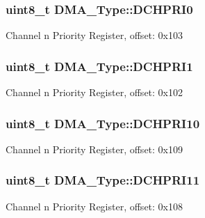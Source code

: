 \subsubsection[{\texorpdfstring{D\+C\+H\+P\+R\+I0}{DCHPRI0}}]{ uint8\+\_\+t D\+M\+A\+\_\+\+Type\+::\+D\+C\+H\+P\+R\+I0}\hypertarget{structDMA__Type_a851878c52a9039091ea516b47e2fe0f4}{}\label{structDMA__Type_a851878c52a9039091ea516b47e2fe0f4}
Channel n Priority Register, offset\+: 0x103 
\subsubsection[{\texorpdfstring{D\+C\+H\+P\+R\+I1}{DCHPRI1}}]{ uint8\+\_\+t D\+M\+A\+\_\+\+Type\+::\+D\+C\+H\+P\+R\+I1}\hypertarget{structDMA__Type_abd7754aad314076952f14a01904df95a}{}\label{structDMA__Type_abd7754aad314076952f14a01904df95a}
Channel n Priority Register, offset\+: 0x102 
\subsubsection[{\texorpdfstring{D\+C\+H\+P\+R\+I10}{DCHPRI10}}]{ uint8\+\_\+t D\+M\+A\+\_\+\+Type\+::\+D\+C\+H\+P\+R\+I10}\hypertarget{structDMA__Type_a03cd2081beed22203536248bfb252ee1}{}\label{structDMA__Type_a03cd2081beed22203536248bfb252ee1}
Channel n Priority Register, offset\+: 0x109 
\subsubsection[{\texorpdfstring{D\+C\+H\+P\+R\+I11}{DCHPRI11}}]{ uint8\+\_\+t D\+M\+A\+\_\+\+Type\+::\+D\+C\+H\+P\+R\+I11}\hypertarget{structDMA__Type_acfcf20e260c1f3e62c62894d964f7270}{}\label{structDMA__Type_acfcf20e260c1f3e62c62894d964f7270}
Channel n Priority Register, offset\+: 0x108 
